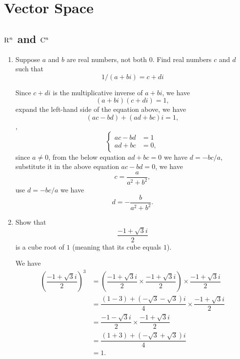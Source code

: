 \section{Vector Space}

\subsection{$\mathrm{R}^n$ and $\mathrm{C}^n$}

\begin{enumerate}
    \item Suppose $a$ and $b$ are real numbers, not both $0$. Find real numbers $c$ and $d$ such that 
        \[ 1/(a+bi) = c + di\] \label{ex:1A-1}
        \begin{solution}
            Since $c + di$ is the multiplicative inverse of $a + bi$, we have 
            \[ (a+bi) (c+di) = 1,\]
            expand the left-hand side of the equation above, we have 
            \[ (ac-bd) + (ad + bc) i = 1,\]
            \ie, 
            \[\begin{cases}
                ac - bd &= 1 \\
                ad + bc &= 0,
            \end{cases}\]
            since $a \neq 0$, from the below equation $ad + bc = 0$ we have $d = -bc/a$, substitute it in the above equation $ac-bd=0$, we have 
            \[ c = \dfrac{a}{a^2 + b^2},\]
            use $d = -bc / a$ we have 
            \[ d = -\dfrac{b}{a^2 + b^2}.\]
        \end{solution}
    \item Show that 
        \[ \dfrac{-1+\sqrt{3}i}{2}\]
        is a cube root of $1$ (meaning that its cube equals $1$).
        \begin{solution}
            We have 
            \begin{align*}
                \left(\dfrac{-1+\sqrt{3}i}{2}\right)^3 &= (\dfrac{-1+\sqrt{3}i}{2}\times \dfrac{-1+\sqrt{3}i}{2}) \times \dfrac{-1+\sqrt{3}i}{2} \\
                                &= \dfrac{(1-3) + (-\sqrt{3}-\sqrt{3})i}{4} \times \dfrac{-1+\sqrt{3}i}{2} \\
                                &= \dfrac{-1-\sqrt{3}i}{2} \times \dfrac{-1+\sqrt{3}i}{2} \\
                                &= \dfrac{(1+3)+(-\sqrt{3}+\sqrt{3})i}{4} \\
                                &= 1.
            \end{align*}
        \end{solution}

\end{enumerate}
